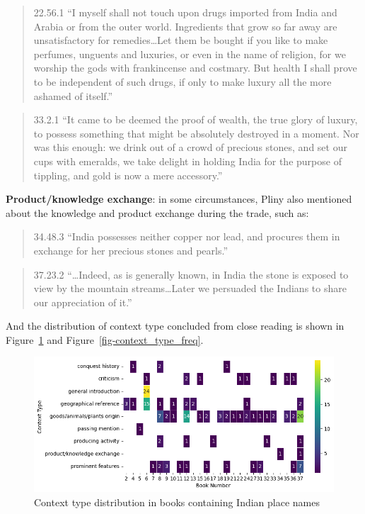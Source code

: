 \documentclass[
  12pt,
]{article}
\begin{document}
\begin{quote}
22.56.1 ``I myself shall not touch upon drugs imported from India and
Arabia or from the outer world. Ingredients that grow so far away are
unsatisfactory for remedies\ldots Let them be bought if you like to make
perfumes, unguents and luxuries, or even in the name of religion, for we
worship the gods with frankincense and costmary. But health I shall
prove to be independent of such drugs, if only to make luxury all the
more ashamed of itself.''
\end{quote}

\begin{quote}
33.2.1 ``It came to be deemed the proof of wealth, the true glory of
luxury, to possess something that might be absolutely destroyed in a
moment. Nor was this enough: we drink out of a crowd of precious stones,
and set our cups with emeralds, we take delight in holding India for the
purpose of tippling, and gold is now a mere accessory.''
\end{quote}

\textbf{Product/knowledge exchange}: in some circumstances, Pliny also
mentioned about the knowledge and product exchange during the trade,
such as:

\begin{quote}
34.48.3 ``India possesses neither copper nor lead, and procures them in
exchange for her precious stones and pearls.''
\end{quote}

\begin{quote}
37.23.2 ``\ldots Indeed, as is generally known, in India the stone is
exposed to view by the mountain streams\ldots Later we persuaded the
Indians to share our appreciation of it.''
\end{quote}

And the distribution of context type concluded from close reading is
shown in Figure~\ref{fig-book_context_distribution} and
Figure~\ref{fig-context_type_freq}.

\begin{figure}

{\centering \includegraphics{NHthesis_structure_files/figure-pdf/fig-book_context_distribution-output-1.png}

}

\caption{\label{fig-book_context_distribution}Context type distribution
in books containing Indian place names}

\end{figure}
\end{document}
